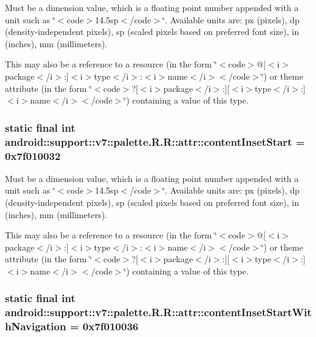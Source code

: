 Must be a dimension value, which is a floating point number appended with a unit such as \char`\"{}$<$code$>$14.5sp$<$/code$>$\char`\"{}. Available units are: px (pixels), dp (density-independent pixels), sp (scaled pixels based on preferred font size), in (inches), mm (millimeters). 

This may also be a reference to a resource (in the form \char`\"{}$<$code$>$@\mbox{[}$<$i$>$package$<$/i$>$:\mbox{]}$<$i$>$type$<$/i$>$:$<$i$>$name$<$/i$>$$<$/code$>$\char`\"{}) or theme attribute (in the form \char`\"{}$<$code$>$?\mbox{[}$<$i$>$package$<$/i$>$:\mbox{]}\mbox{[}$<$i$>$type$<$/i$>$:\mbox{]}$<$i$>$name$<$/i$>$$<$/code$>$\char`\"{}) containing a value of this type. \hypertarget{classandroid_1_1support_1_1v7_1_1palette_1_1_r_1_1attr_a42dcab62f2e0be87fc10fa9606c2097}{
\subsubsection[{contentInsetStart}]{\setlength{\rightskip}{0pt plus 5cm}static final int android::support::v7::palette.R.R::attr::contentInsetStart = 0x7f010032}}
\label{classandroid_1_1support_1_1v7_1_1palette_1_1_r_1_1attr_a42dcab62f2e0be87fc10fa9606c2097}


Must be a dimension value, which is a floating point number appended with a unit such as \char`\"{}$<$code$>$14.5sp$<$/code$>$\char`\"{}. Available units are: px (pixels), dp (density-independent pixels), sp (scaled pixels based on preferred font size), in (inches), mm (millimeters). 

This may also be a reference to a resource (in the form \char`\"{}$<$code$>$@\mbox{[}$<$i$>$package$<$/i$>$:\mbox{]}$<$i$>$type$<$/i$>$:$<$i$>$name$<$/i$>$$<$/code$>$\char`\"{}) or theme attribute (in the form \char`\"{}$<$code$>$?\mbox{[}$<$i$>$package$<$/i$>$:\mbox{]}\mbox{[}$<$i$>$type$<$/i$>$:\mbox{]}$<$i$>$name$<$/i$>$$<$/code$>$\char`\"{}) containing a value of this type. \hypertarget{classandroid_1_1support_1_1v7_1_1palette_1_1_r_1_1attr_4160e5c6d82761d831a05d2e6fc6c735}{
\subsubsection[{contentInsetStartWithNavigation}]{\setlength{\rightskip}{0pt plus 5cm}static final int android::support::v7::palette.R.R::attr::contentInsetStartWithNavigation = 0x7f010036}}
\label{classandroid_1_1support_1_1v7_1_1palette_1_1_r_1_1attr_4160e5c6d82761d831a05d2e6fc6c735}


